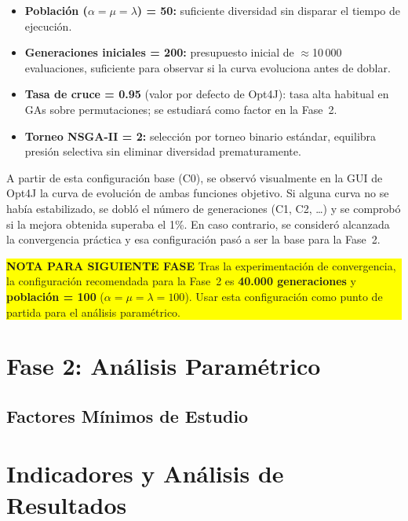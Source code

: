 \documentclass[11pt,a4paper]{article}
\begin{document}
\begin{itemize}
  \item \textbf{Población ($\alpha = \mu = \lambda$) = 50:} suficiente diversidad sin
        disparar el tiempo de ejecución.
  \item \textbf{Generaciones iniciales = 200:} presupuesto inicial de $\approx$10\,000
        evaluaciones, suficiente para observar si la curva evoluciona antes de doblar.
  \item \textbf{Tasa de cruce = 0.95} (valor por defecto de Opt4J): tasa alta habitual
        en GAs sobre permutaciones; se estudiará como factor en la Fase~2.
  \item \textbf{Torneo NSGA-II = 2:} selección por torneo binario estándar, equilibra
        presión selectiva sin eliminar diversidad prematuramente.
\end{itemize}

A partir de esta configuración base (C0), se observó visualmente en la GUI de Opt4J
la curva de evolución de ambas funciones objetivo. Si alguna curva no se había
estabilizado, se dobló el número de generaciones (C1, C2, \ldots) y se comprobó si
la mejora obtenida superaba el 1\%. En caso contrario, se consideró alcanzada la
convergencia práctica y esa configuración pasó a ser la base para la Fase~2.


\vspace{0.5em}
\noindent\colorbox{yellow}{%
  \parbox{\dimexpr\linewidth-2\fboxsep}{%
    \textbf{NOTA PARA SIGUIENTE FASE} Tras la experimentación de convergencia, la configuración
    recomendada para la Fase~2 es \textbf{40.000 generaciones} y \textbf{población = 100}
    ($\alpha = \mu = \lambda = 100$).    Usar esta configuración como punto de partida para el análisis paramétrico.
  }%
}
\vspace{0.5em}

\section{Fase 2: Análisis Paramétrico}

\subsection{Factores Mínimos de Estudio}

\section{Indicadores y Análisis de Resultados}
\end{document}
